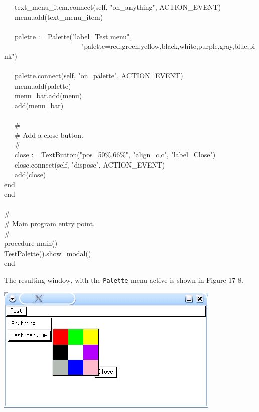 {\>   \ \ \ text\_menu\_item.connect(self,
"on\_anything", ACTION\_EVENT) \\
\>   \ \ \ menu.add(text\_menu\_item) \\
\ \\
\>   \ \ \ palette := Palette("label=Test
menu", \\
\>   \ \ \ \ \ \ \ \ \ \ \ \ \ \ \ \ \ \ \ \ \ \ "palette=red,green,yellow,black,white,purple,gray,blue,pink") \\
\ \\
\>   \ \ \ palette.connect(self,
"on\_palette", ACTION\_EVENT) \\
\>   \ \ \ menu.add(palette) \\
\>   \ \ \ menu\_bar.add(menu) \\
\>   \ \ \ add(menu\_bar) \\
\ \\
\>   \ \ \ \# \\
\>   \ \ \ \# Add a close button.  \\
\>   \ \ \ \# \\
\>   \ \ \ close :=
TextButton("pos=50\%,66\%",
"align=c,c",
"label=Close") \\
\>   \ \ \ close.connect(self, "dispose",
ACTION\_EVENT) \\
\>   \ \ \ add(close) \\
\>   end \\
end \\
\ \\
\# \\
\# Main program entry point. \\
\# \\
procedure main() \\
\>   TestPalette().show\_modal() \\
end
}

\bigskip

The resulting window, with the \texttt{Palette} menu active is shown in
Figure 17-8.

\begin{center}
\includegraphics[width=4.2398in,height=2.3953in]{ub-img/ub-img57.jpg}
\end{center}

